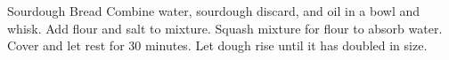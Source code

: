 \documentclass[../main.tex]{subfiles}
\begin{document}
\begin{recipe}{Sourdough Bread}{}{}
    Combine water, sourdough discard, and oil in a bowl and whisk.
    Add flour and salt to mixture. Squash mixture for flour to
    absorb water. Cover and let rest for 30 minutes. Let dough
    rise until it has doubled in size.
\end{recipe}
\end{document}
